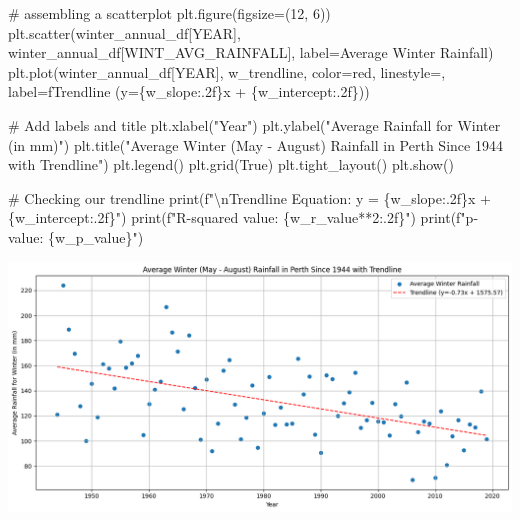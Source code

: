 \documentclass[
  letterpaper,
  DIV=11,
  numbers=noendperiod]{scrartcl}
\newenvironment{Shaded}{\begin{snugshade}}{\end{snugshade}}
\newcommand{\BuiltInTok}[1]{\textcolor[rgb]{0.00,0.23,0.31}{#1}}
\newcommand{\CharTok}[1]{\textcolor[rgb]{0.13,0.47,0.30}{#1}}
\newcommand{\CommentTok}[1]{\textcolor[rgb]{0.37,0.37,0.37}{#1}}
\newcommand{\DecValTok}[1]{\textcolor[rgb]{0.68,0.00,0.00}{#1}}
\newcommand{\NormalTok}[1]{\textcolor[rgb]{0.00,0.23,0.31}{#1}}
\newcommand{\OperatorTok}[1]{\textcolor[rgb]{0.37,0.37,0.37}{#1}}
\newcommand{\SpecialCharTok}[1]{\textcolor[rgb]{0.37,0.37,0.37}{#1}}
\newcommand{\SpecialStringTok}[1]{\textcolor[rgb]{0.13,0.47,0.30}{#1}}
\newcommand{\StringTok}[1]{\textcolor[rgb]{0.13,0.47,0.30}{#1}}
\newcommand{\VariableTok}[1]{\textcolor[rgb]{0.07,0.07,0.07}{#1}}
\begin{document}
\begin{Shaded}
\begin{Highlighting}[]
\CommentTok{\# assembling a scatterplot}
\NormalTok{plt.figure(figsize}\OperatorTok{=}\NormalTok{(}\DecValTok{12}\NormalTok{, }\DecValTok{6}\NormalTok{))}
\NormalTok{plt.scatter(winter\_annual\_df[}\StringTok{\textquotesingle{}YEAR\textquotesingle{}}\NormalTok{], winter\_annual\_df[}\StringTok{\textquotesingle{}WINT\_AVG\_RAINFALL\textquotesingle{}}\NormalTok{], label}\OperatorTok{=}\StringTok{\textquotesingle{}Average Winter Rainfall\textquotesingle{}}\NormalTok{)}
\NormalTok{plt.plot(winter\_annual\_df[}\StringTok{\textquotesingle{}YEAR\textquotesingle{}}\NormalTok{], w\_trendline, color}\OperatorTok{=}\StringTok{\textquotesingle{}red\textquotesingle{}}\NormalTok{, linestyle}\OperatorTok{=}\StringTok{\textquotesingle{}{-}{-}\textquotesingle{}}\NormalTok{, label}\OperatorTok{=}\SpecialStringTok{f\textquotesingle{}Trendline (y=}\SpecialCharTok{\{}\NormalTok{w\_slope}\SpecialCharTok{:.2f\}}\SpecialStringTok{x + }\SpecialCharTok{\{}\NormalTok{w\_intercept}\SpecialCharTok{:.2f\}}\SpecialStringTok{)\textquotesingle{}}\NormalTok{)}

\CommentTok{\# Add labels and title}
\NormalTok{plt.xlabel(}\StringTok{"Year"}\NormalTok{)}
\NormalTok{plt.ylabel(}\StringTok{"Average Rainfall for Winter (in mm)"}\NormalTok{)}
\NormalTok{plt.title(}\StringTok{"Average Winter (May {-} August) Rainfall in Perth Since 1944 with Trendline"}\NormalTok{)}
\NormalTok{plt.legend()}
\NormalTok{plt.grid(}\VariableTok{True}\NormalTok{)}
\NormalTok{plt.tight\_layout()}
\NormalTok{plt.show()}

\CommentTok{\# Checking our trendline}
\BuiltInTok{print}\NormalTok{(}\SpecialStringTok{f"}\CharTok{\textbackslash{}n}\SpecialStringTok{Trendline Equation: y = }\SpecialCharTok{\{}\NormalTok{w\_slope}\SpecialCharTok{:.2f\}}\SpecialStringTok{x + }\SpecialCharTok{\{}\NormalTok{w\_intercept}\SpecialCharTok{:.2f\}}\SpecialStringTok{"}\NormalTok{)}
\BuiltInTok{print}\NormalTok{(}\SpecialStringTok{f"R{-}squared value: }\SpecialCharTok{\{}\NormalTok{w\_r\_value}\OperatorTok{**}\DecValTok{2}\SpecialCharTok{:.2f\}}\SpecialStringTok{"}\NormalTok{)}
\BuiltInTok{print}\NormalTok{(}\SpecialStringTok{f"p{-}value: }\SpecialCharTok{\{}\NormalTok{w\_p\_value}\SpecialCharTok{\}}\SpecialStringTok{"}\NormalTok{)}
\end{Highlighting}
\end{Shaded}

\includegraphics{Assignment-1_ICP_files/figure-pdf/cell-6-output-1.png}
\end{document}
